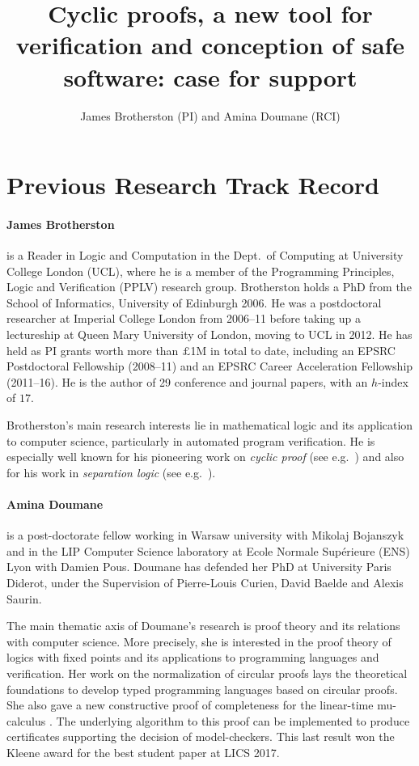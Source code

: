 \documentclass[11pt,twocolumn]{article}
\title{\textbf{
Cyclic proofs, a new tool for verification and conception of safe software: case for support
} }
\author{
James Brotherston (PI) and Amina Doumane (RCI)
}
\date{}
\begin{document}
\twocolumn[\begin{@twocolumnfalse}
\maketitle
\end{@twocolumnfalse}]

\begin{abstract}
\end{abstract}

\section{Previous Research Track Record}
\paragraph{James Brotherston} is a Reader in Logic and Computation in the Dept.\ of Computing at University College London (UCL), where he is a member of the Programming Principles, Logic and Verification (PPLV) research group.  Brotherston holds a PhD from the School of Informatics, University of Edinburgh 2006.  He was a postdoctoral researcher at Imperial College London from 2006--11 before taking up a lectureship at Queen Mary University of London, moving to UCL in 2012. He has held as PI grants worth more than $\pounds$1M in total to date, including an EPSRC Postdoctoral Fellowship (2008--11) and an EPSRC Career Acceleration Fellowship (2011--16). He is the author of 29 conference and journal papers, with an $h$-index of $17$.

Brotherston's main research interests lie in mathematical logic and its application to computer science, particularly in automated program verification. He is especially well known for his pioneering work on \emph{cyclic proof} (see e.g.~) and also for his work in \emph{separation logic} (see e.g.~). 

\paragraph{Amina Doumane}  is a post-doctorate fellow working in Warsaw university with Mikolaj Bojanszyk and in the
LIP Computer Science laboratory at Ecole Normale
Supérieure (ENS) Lyon with Damien Pous.
Doumane has defended her PhD at University Paris Diderot,
under the Supervision of Pierre-Louis Curien, David
Baelde and Alexis Saurin.


The main thematic axis of Doumane's research is proof theory and its relations with computer science. More precisely, she is interested in the proof theory of logics with fixed points and its applications to programming languages and verification. Her work on the normalization of circular proofs  lays the theoretical foundations to develop typed programming languages based on circular proofs. She also gave a new constructive proof of completeness for the linear-time mu-calculus . The underlying  algorithm to this proof can be implemented to produce certificates supporting the decision of model-checkers. This last result won the Kleene award for the best student paper at LICS 2017. 
\end{document}
